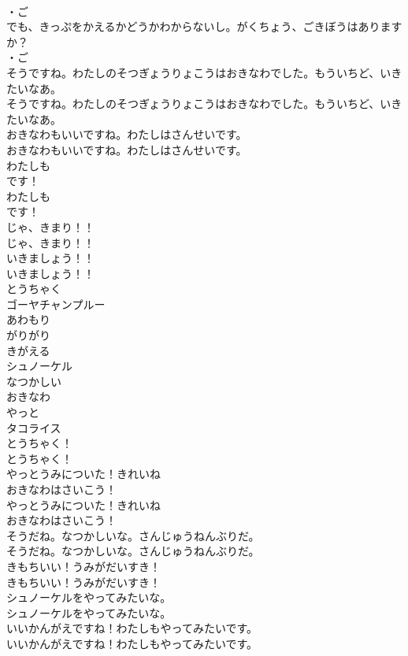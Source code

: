 \documentclass[8pt]{extreport}
\begin{document}
\begin{CJK}{UTF8}{min}
\\	・ご 
\\	でも、きっぷをかえるかどうかわからないし。がくちょう、ごきぼうはありますか？
\\	・ご 
\\	そうですね。わたしのそつぎょうりょこうはおきなわでした。もういちど、いきたいなあ。
\\	そうですね。わたしのそつぎょうりょこうはおきなわでした。もういちど、いきたいなあ。
\\	おきなわもいいですね。わたしはさんせいです。
\\	おきなわもいいですね。わたしはさんせいです。
\\	わたしも
\\	です！
\\	わたしも
\\	です！
\\	じゃ、きまり！！
\\	じゃ、きまり！！
\\	いきましょう！！
\\	いきましょう！！
\\	とうちゃく
\\	ゴーヤチャンプルー
\\	あわもり
\\	がりがり
\\	きがえる
\\	シュノーケル
\\	なつかしい
\\	おきなわ
\\	やっと
\\	タコライス
\\	とうちゃく！
\\	とうちゃく！
\\	やっとうみについた！きれいね
\\	おきなわはさいこう！
\\	やっとうみについた！きれいね
\\	おきなわはさいこう！
\\	そうだね。なつかしいな。さんじゅうねんぶりだ。
\\	そうだね。なつかしいな。さんじゅうねんぶりだ。
\\	きもちいい！うみがだいすき！
\\	きもちいい！うみがだいすき！
\\	シュノーケルをやってみたいな。
\\	シュノーケルをやってみたいな。
\\	いいかんがえですね！わたしもやってみたいです。
\\	いいかんがえですね！わたしもやってみたいです。

\end{CJK}
\end{document}
